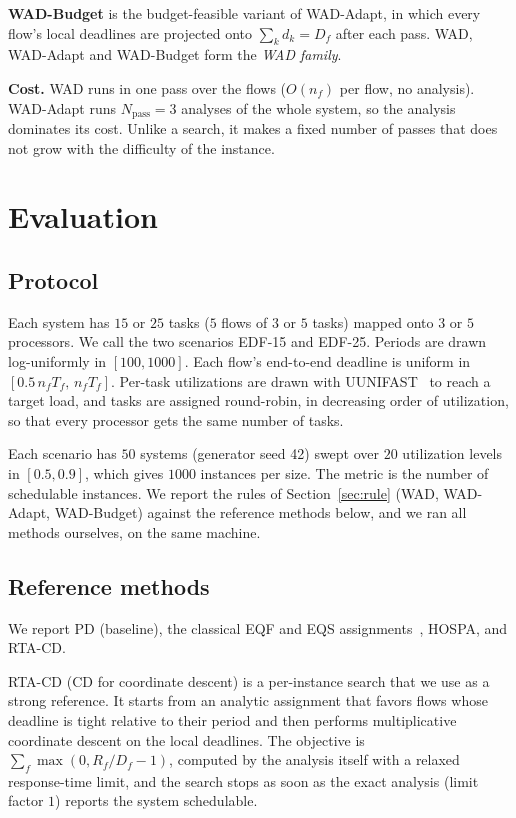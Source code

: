 \documentclass[conference]{IEEEtran}
\begin{document}
\textbf{WAD-Budget} is the budget-feasible variant of WAD-Adapt, in which every
flow's local deadlines are projected onto $\sum_k d_k=D_f$ after each pass. WAD,
WAD-Adapt and WAD-Budget form the \emph{WAD family}.

\smallskip\noindent\textbf{Cost.} WAD runs in one pass over the flows ($O(n_f)$ per
flow, no analysis). WAD-Adapt runs $N_{\mathrm{pass}}{=}3$ analyses of the whole
system, so the analysis dominates its cost. Unlike a search, it makes a fixed
number of passes that does not grow with the difficulty of the instance.

\section{Evaluation}
\label{sec:eval}

\subsection{Protocol}
Each system has $15$ or $25$ tasks ($5$ flows of $3$ or $5$ tasks) mapped onto
$3$ or $5$ processors. We call the two scenarios EDF-15 and EDF-25. Periods are
drawn log-uniformly in $[100,1000]$. Each flow's end-to-end deadline is uniform
in $[0.5\,n_f T_f,\,n_f T_f]$. Per-task utilizations are drawn with
UUNIFAST~\cite{uunifast} to reach a target load, and tasks are assigned
round-robin, in decreasing order of utilization, so that every processor gets the
same number of tasks.

Each scenario has $50$ systems (generator seed 42) swept over $20$ utilization
levels in $[0.5,0.9]$, which gives $1000$ instances per size. The metric is the
number of schedulable instances. We report the rules of Section~\ref{sec:rule}
(WAD, WAD-Adapt, WAD-Budget) against the reference methods below, and we ran all
methods ourselves, on the same machine.

\subsection{Reference methods}
We report PD (baseline), the classical EQF and EQS assignments~\cite{dinatale},
HOSPA, and RTA-CD.

RTA-CD (CD for coordinate descent) is a per-instance search that we use as a
strong reference. It starts from an analytic assignment that favors flows whose
deadline is tight relative to their period and then performs multiplicative
coordinate descent on the local deadlines. The objective is
$\sum_f \max(0, R_f/D_f-1)$, computed by the analysis itself with a relaxed
response-time limit, and the search stops as soon as the exact analysis (limit
factor $1$) reports the system schedulable.
\end{document}
